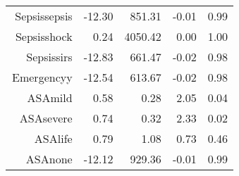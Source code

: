 \begin{tabular}{rrrrr}
$$  Sepsis\-sepsis & -12.30 & 851.31 & -0.01 & 0.99 \\ 
  Sepsis\-shock & 0.24 & 4050.42 & 0.00 & 1.00 \\ 
  Sepsis\-sirs & -12.83 & 661.47 & -0.02 & 0.98 \\ 
  Emergency\-y & -12.54 & 613.67 & -0.02 & 0.98 \\ 
  ASA\-mild & 0.58 & 0.28 & 2.05 & 0.04 \\ 
  ASA\-severe & 0.74 & 0.32 & 2.33 & 0.02 \\ 
  ASA\-life & 0.79 & 1.08 & 0.73 & 0.46 \\ 
  ASA\-none & -12.12 & 929.36 & -0.01 & 0.99 \\ 
   \hline
\end{tabular}

